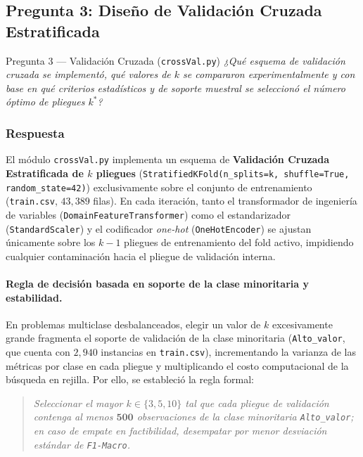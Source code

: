 \documentclass[11pt,a4paper]{article}
\newcommand{\code}[1]{\texttt{\small #1}}
\begin{document}
\subsection{Pregunta 3: Diseño de Validación Cruzada Estratificada}

\begin{pregunta}{Pregunta 3 --- Validación Cruzada (\texttt{crossVal.py})}{}
\textit{¿Qué esquema de validación cruzada se implementó, qué valores de $k$ se compararon experimentalmente y con base en qué criterios estadísticos y de soporte muestral se seleccionó el número óptimo de pliegues $k^*$?}
\end{pregunta}

\subsubsection*{Respuesta}

El módulo \code{crossVal.py} implementa un esquema de \textbf{Validación Cruzada Estratificada de $k$ pliegues} (\code{StratifiedKFold(n\_splits=k, shuffle=True, random\_state=42)}) exclusivamente sobre el conjunto de entrenamiento (\code{train.csv}, $43{,}389$ filas). En cada iteración, tanto el transformador de ingeniería de variables (\code{DomainFeatureTransformer}) como el estandarizador (\code{StandardScaler}) y el codificador \textit{one-hot} (\code{OneHotEncoder}) se ajustan únicamente sobre los $k-1$ pliegues de entrenamiento del fold activo, impidiendo cualquier contaminación hacia el pliegue de validación interna.

\paragraph{Regla de decisión basada en soporte de la clase minoritaria y estabilidad.}
En problemas multiclase desbalanceados, elegir un valor de $k$ excesivamente grande fragmenta el soporte de validación de la clase minoritaria (\code{Alto\_valor}, que cuenta con $2{,}940$ instancias en \code{train.csv}), incrementando la varianza de las métricas por clase en cada pliegue y multiplicando el costo computacional de la búsqueda en rejilla. Por ello, se estableció la regla formal:
\begin{quote}
\textit{Seleccionar el mayor $k \in \{3, 5, 10\}$ tal que cada pliegue de validación contenga al menos $\mathbf{500}$ observaciones de la clase minoritaria \code{Alto\_valor}; en caso de empate en factibilidad, desempatar por menor desviación estándar de \code{F1-Macro}.}
\end{quote}
\end{document}
